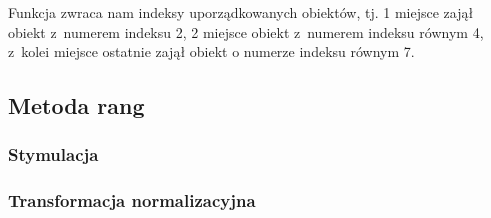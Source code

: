 \documentclass[12pt,a4paper]{report}
\begin{document}
{Funkcja zwraca nam indeksy uporządkowanych obiektów, tj. 1 miejsce
zajął obiekt z~numerem indeksu 2, 2 miejsce obiekt z~numerem indeksu
równym 4, z~kolei miejsce ostatnie zajął obiekt o numerze indeksu równym
7.
\subsection{Metoda rang}
\subsubsection{Stymulacja} 
\begin{Shaded}
\begin{Highlighting}[]
\NormalTok{)} 
\end{Highlighting}
\end{Shaded}
\subsubsection{Transformacja normalizacyjna}
\begin{Shaded}
\begin{Highlighting}[]
\end{Highlighting}
\end{Shaded}
}
\end{document}
